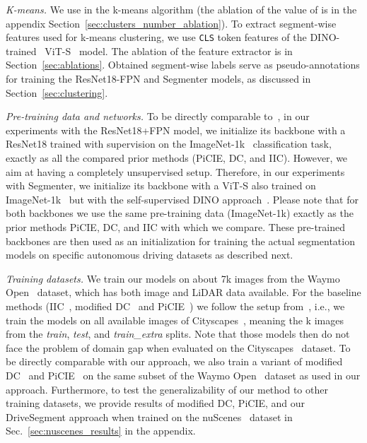 \documentclass[runningheads]{llncs}
\newcommand{\ours}{DriveSegment\xspace}
\newcommand{\supp}{appendix\xspace}
\begin{document}
\emph{K-means.} We use  in the k-means algorithm (the ablation of the value of  is in the 
\supp
Section~\ref{sec:clusters_number_ablation}). To extract segment-wise features used for k-means clustering, we use \texttt{CLS} token features of the DINO-trained~\cite{caron2021emerging} ViT-S~\cite{dosovitskiy2021image} model. The ablation of the feature extractor is in Section~\ref{sec:ablations}. Obtained segment-wise labels serve as pseudo-annotations for training the ResNet18-FPN and Segmenter models, as discussed in Section~\ref{sec:clustering}.


\emph{Pre-training data and networks.}
To be directly comparable to~\cite{cho2021picie}, in our experiments with the ResNet18+FPN model, we initialize its backbone with a ResNet18 trained with supervision on the ImageNet-1k~\cite{deng2009imagenet} classification task, exactly as all the compared prior methods (PiCIE, DC, and IIC). However, we aim at having a completely unsupervised setup. Therefore, in our experiments with Segmenter, we initialize its backbone with a ViT-S also trained on ImageNet-1k~\cite{deng2009imagenet} but with the self-supervised DINO approach~\cite{caron2021emerging}. Please note that for both backbones we use the same pre-training data (ImageNet-1k) exactly as the prior methods PiCIE, DC, and IIC with which we compare.
These pre-trained backbones are then used as an initialization for training the actual segmentation models on specific autonomous driving datasets as described next.

\emph{Training datasets.}
We train our models on about 7k images from the Waymo Open~\cite{sun2020scalability} dataset, which has both image and LiDAR data available.
For the baseline methods (IIC~\cite{ji2019invariant}, modified DC~\cite{caron2018deep} and PiCIE~\cite{cho2021picie}) we follow the setup from~\cite{cho2021picie}, i.e., we train the models on all available images of Cityscapes~\cite{Cordts2016Cityscapes}, meaning the k images from the \textit{train}, \textit{test}, and \textit{train\_extra} splits. Note that those models then do not face the problem of domain gap when evaluated on the Cityscapes~\cite{Cordts2016Cityscapes} dataset.
To be directly comparable with our approach, we also train a variant of modified DC~\cite{caron2018deep} and PiCIE~\cite{cho2021picie} on the same subset of the Waymo Open~\cite{sun2020scalability} dataset as used in our approach. 
Furthermore, to test the generalizability of our method to other training datasets, we provide results of modified DC, PiCIE, and our \ours approach when trained on the nuScenes~\cite{nuscenes} dataset in Sec.~\ref{sec:nuscenes_results} in the 
\supp.
\end{document}
